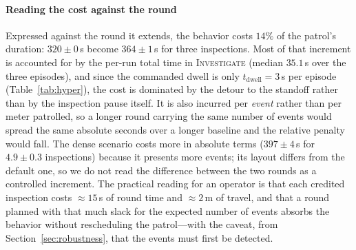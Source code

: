 \paragraph*{Reading the cost against the round}
Expressed against the round it extends, the behavior costs $14\%$ of the patrol's
duration: $320\pm0$\,s become $364\pm1$\,s for three inspections. Most of that
increment is accounted for by the per-run total time in \textsc{Investigate}
(median $35.1$\,s over the three episodes), and since the commanded dwell is only
$t_{\text{dwell}}=3$\,s per episode (Table~\ref{tab:hyper}), the cost is dominated
by the detour to the standoff rather than by the inspection pause itself. It is
also incurred per \emph{event} rather than per meter patrolled, so a longer round
carrying the same number of events would spread the same absolute seconds over a
longer baseline and the relative penalty would fall. The dense scenario costs more
in absolute terms ($397\pm4$\,s for $4.9\pm0.3$ inspections) because it presents
more events; its layout differs from the default one, so we do not read the
difference between the two rounds as a controlled increment. The practical reading
for an operator is that each credited inspection costs ${\approx}15$\,s of round
time and ${\approx}2$\,m of travel, and that a round planned with that much slack
for the expected number of events absorbs the behavior without rescheduling the
patrol---with the caveat, from Section~\ref{sec:robustness}, that the events must
first be detected.

